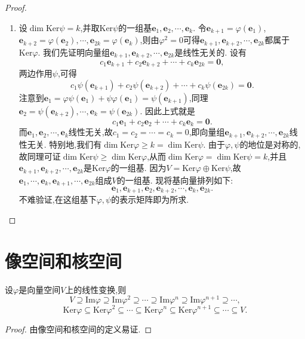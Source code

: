 \documentclass[lang=cn,newtx,10pt,scheme=chinese]{elegantbook}
\begin{document}
\begin{proof}
\begin{enumerate}[(1)]
    \item 设\(\dim\text{Ker}\psi=k\),并取\(\text{Ker}\psi\)的一组基\(\boldsymbol{e}_1,\boldsymbol{e}_2,\cdots,\boldsymbol{e}_k\). 令\(\boldsymbol{e}_{k + 1}=\varphi(\boldsymbol{e}_1)\),\(\boldsymbol{e}_{k + 2}=\varphi(\boldsymbol{e}_2),\cdots,\boldsymbol{e}_{2k}=\varphi(\boldsymbol{e}_k)\),则由\(\varphi^2 = 0\)可得\(\boldsymbol{e}_{k + 1},\boldsymbol{e}_{k + 2},\cdots,\boldsymbol{e}_{2k}\)都属于\(\text{Ker}\varphi\). 我们先证明向量组\(\boldsymbol{e}_{k + 1},\boldsymbol{e}_{k + 2},\cdots,\boldsymbol{e}_{2k}\)是线性无关的. 设有
    \[
    c_1\boldsymbol{e}_{k + 1}+c_2\boldsymbol{e}_{k + 2}+\cdots + c_k\boldsymbol{e}_{2k}=\boldsymbol{0},
    \]
    两边作用\(\psi\),可得
    \[
    c_1\psi(\boldsymbol{e}_{k + 1})+c_2\psi(\boldsymbol{e}_{k + 2})+\cdots + c_k\psi(\boldsymbol{e}_{2k})=\boldsymbol{0}.
    \]
    注意到\(\boldsymbol{e}_1=\varphi\psi(\boldsymbol{e}_1)+\psi\varphi(\boldsymbol{e}_1)=\psi(\boldsymbol{e}_{k + 1})\),同理\(\boldsymbol{e}_2=\psi(\boldsymbol{e}_{k + 2}),\cdots,\boldsymbol{e}_k=\psi(\boldsymbol{e}_{2k})\). 因此上式就是
    \[
    c_1\boldsymbol{e}_1+c_2\boldsymbol{e}_2+\cdots + c_k\boldsymbol{e}_k=\boldsymbol{0}.
    \]
    而\(\boldsymbol{e}_1,\boldsymbol{e}_2,\cdots,\boldsymbol{e}_k\)线性无关,故\(c_1 = c_2=\cdots = c_k = 0\),即向量组\(\boldsymbol{e}_{k + 1},\boldsymbol{e}_{k + 2},\cdots,\boldsymbol{e}_{2k}\)线性无关. 特别地,我们有\(\dim\text{Ker}\varphi\geq k=\dim\text{Ker}\psi\). 由于\(\varphi,\psi\)的地位是对称的,故同理可证\(\dim\text{Ker}\psi\geq\dim\text{Ker}\varphi\),从而\(\dim\text{Ker}\varphi=\dim\text{Ker}\psi = k\),并且\(\boldsymbol{e}_{k + 1},\boldsymbol{e}_{k + 2},\cdots,\boldsymbol{e}_{2k}\)是\(\text{Ker}\varphi\)的一组基. 因为\(V=\text{Ker}\varphi\oplus\text{Ker}\psi\),故\(\boldsymbol{e}_1,\cdots,\boldsymbol{e}_k,\boldsymbol{e}_{k + 1},\cdots,\boldsymbol{e}_{2k}\)组成\(V\)的一组基. 现将基向量排列如下:
    \[
    \boldsymbol{e}_1,\boldsymbol{e}_{k + 1},\boldsymbol{e}_2,\boldsymbol{e}_{k + 2},\cdots,\boldsymbol{e}_k,\boldsymbol{e}_{2k}.
    \]
    不难验证,在这组基下\(\varphi,\psi\)的表示矩阵即为所求.
\end{enumerate}
\end{proof}

\section{像空间和核空间}

\begin{proposition}\label{proposition:像空间和核空间的子空间链}
设\(\varphi\)是向量空间\(V\)上的线性变换,则
\[
V\supseteq \mathrm{Im}\varphi \supseteq \mathrm{Im}\varphi^2 \supseteq \cdots \supseteq \mathrm{Im}\varphi^n \supseteq \mathrm{Im}\varphi^{n + 1} \supseteq \cdots,
\]
\[
\mathrm{Ker}\varphi \subseteq \mathrm{Ker}\varphi ^2\subseteq \cdots \subseteq \mathrm{Ker}\varphi ^n\subseteq \mathrm{Ker}\varphi ^{n+1}\subseteq \cdots \subseteq V.
\]
\end{proposition}
\begin{proof}
    由像空间和核空间的定义易证.
\end{proof}
\end{document}
